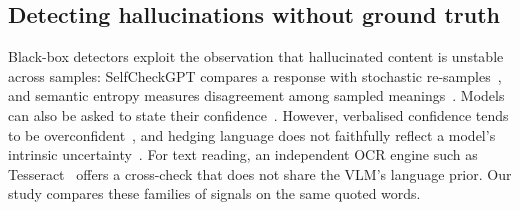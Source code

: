 \subsection{Detecting hallucinations without ground truth}

Black-box detectors exploit the observation that hallucinated content is unstable across samples: SelfCheckGPT compares a response with stochastic re-samples~\cite{manakul2023selfcheckgpt}, and semantic entropy measures disagreement among sampled meanings~\cite{kuhn2023semantic,farquhar2024detecting}. Models can also be asked to state their confidence~\cite{lin2022teaching,kadavath2022language}. However, verbalised confidence tends to be overconfident~\cite{xiong2023can}, and hedging language does not faithfully reflect a model's intrinsic uncertainty~\cite{yona2024can}. For text reading, an independent OCR engine such as Tesseract~\cite{smith2007overview} offers a cross-check that does not share the VLM's language prior. Our study compares these families of signals on the same quoted words.
